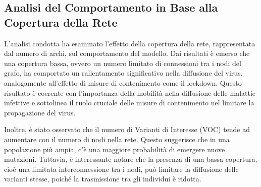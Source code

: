 \subsection{Analisi del Comportamento in Base alla Copertura della Rete}

L'analisi condotta ha esaminato l'effetto della copertura della rete, 
rappresentata dal numero di archi, sul comportamento del modello. 
Dai risultati è emerso che una copertura bassa, ovvero un numero 
limitato di connessioni tra i nodi del grafo, ha comportato un 
rallentamento significativo nella diffusione del virus, analogamente 
all'effetto di misure di contenimento come il lockdown. 
Questo risultato è coerente con l'importanza della mobilità nella 
diffusione delle malattie infettive e sottolinea il ruolo cruciale 
delle misure di contenimento nel limitare la propagazione del virus.

Inoltre, è stato osservato che il numero di Varianti di Interesse 
(VOC) tende ad aumentare con il numero di nodi nella rete. 
Questo suggerisce che in una popolazione più ampia, c'è una maggiore 
probabilità di emergere nuove mutazioni. Tuttavia, è interessante 
notare che la presenza di una bassa copertura, cioè una limitata 
interconnessione tra i nodi, può limitare la diffusione delle varianti 
stesse, poiché la trasmissione tra gli individui è ridotta.

